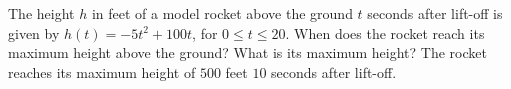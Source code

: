 {The height $h$ in feet of a model rocket above the ground $t$ seconds after lift-off is given by $h(t) = -5t^2+100t$, for $0 \leq t \leq 20$.  When does the rocket reach its maximum height above the ground?  What is its maximum height?}
{The rocket reaches its maximum height of $500$ feet $10$ seconds after lift-off.}